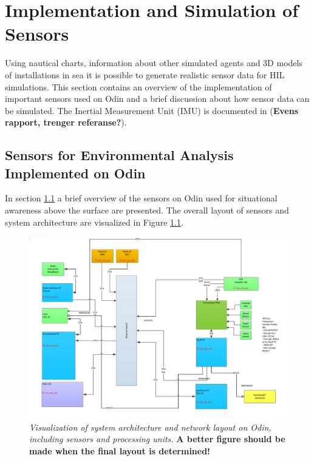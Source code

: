 \chapter{Implementation and Simulation of Sensors}
Using nautical charts, information about other simulated agents and 3D models of installations in sea it is possible to generate realistic sensor data for HIL simulations. This section contains an overview of the implementation of important sensors used on Odin and a brief discussion about how sensor data can be simulated. The Inertial Measurement Unit (IMU) is documented in (\textbf{Evens rapport, trenger referanse?}).

\section{Sensors for Environmental Analysis Implemented on Odin}
\label{SensorOverview}
In section \ref{SensorOverview} a brief overview of the sensors on Odin used for situational awareness above the surface are presented. The overall layout of sensors and system architecture are visualized in Figure \ref{fig:systemArchitecture}.

\begin{figure}[H]
	\begin{center}
		\includegraphics[width = 1\linewidth]{fig/SystemarkitekturOdin.pdf}
		\caption{\textit{Visualization of system architecture and network layout on Odin, including sensors and processing units.} \textbf{A better figure should be made when the final layout is determined!}}
		\label{fig:systemArchitecture}
	\end{center}
\end{figure}


